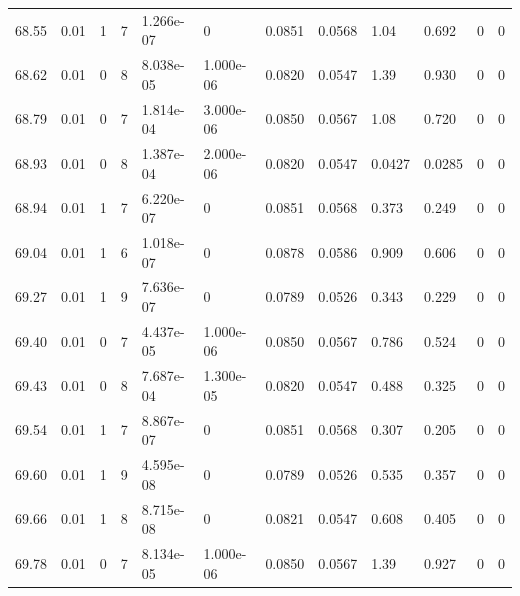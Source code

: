 \documentclass[preview]{standalone}
\begin{document}
{{{{{{{{{{{{{{{{{{\begin{tabular}{L{1.2cm}C{1.2cm} C{0.3cm}C{0.5cm} C{1.4cm}C{1.4cm} C{1.4cm}C{1.4cm} C{1.6cm}C{1.6cm} C{1.6cm}C{1.6cm}}
  68.55  &  0.01  & 1     &  7 &  1.266e-07  & 0  &  0.0851&   0.0568& 1.04 & 0.692   &  0 & 0  \\ 
  68.62  &  0.01  & 0     &  8 &  8.038e-05  & 1.000e-06  &  0.0820&   0.0547& 1.39 & 0.930   &  0 & 0  \\ 
  68.79  &  0.01  & 0     &  7 &  1.814e-04  & 3.000e-06  &  0.0850&   0.0567& 1.08 & 0.720   &  0 & 0  \\ 
  68.93  &  0.01  & 0     &  8 &  1.387e-04  & 2.000e-06  &  0.0820&   0.0547& 0.0427 & 0.0285   &  0 & 0  \\ 
  68.94  &  0.01  & 1     &  7 &  6.220e-07  & 0  &  0.0851&   0.0568& 0.373 & 0.249   &  0 & 0  \\ 
  69.04  &  0.01  & 1     &  6 &  1.018e-07  & 0  &  0.0878&   0.0586& 0.909 & 0.606   &  0 & 0  \\ 
  69.27  &  0.01  & 1     &  9 &  7.636e-07  & 0  &  0.0789&   0.0526& 0.343 & 0.229   &  0 & 0  \\ 
  69.40  &  0.01  & 0     &  7 &  4.437e-05  & 1.000e-06  &  0.0850&   0.0567& 0.786 & 0.524   &  0 & 0  \\ 
  69.43  &  0.01  & 0     &  8 &  7.687e-04  & 1.300e-05  &  0.0820&   0.0547& 0.488 & 0.325   &  0 & 0  \\ 
  69.54  &  0.01  & 1     &  7 &  8.867e-07  & 0  &  0.0851&   0.0568& 0.307 & 0.205   &  0 & 0  \\ 
  69.60  &  0.01  & 1     &  9 &  4.595e-08  & 0  &  0.0789&   0.0526& 0.535 & 0.357   &  0 & 0  \\ 
  69.66  &  0.01  & 1     &  8 &  8.715e-08  & 0  &  0.0821&   0.0547& 0.608 & 0.405   &  0 & 0  \\ 
  69.78  &  0.01  & 0     &  7 &  8.134e-05  & 1.000e-06  &  0.0850&   0.0567& 1.39 & 0.927   &  0 & 0  \\ 
\hline 
\end{tabular} 

}}}}}}}}}}}}}}}}}}
\end{document}
